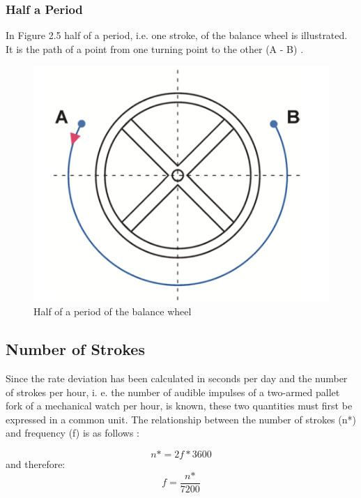 \documentclass[12pt, a4paper]{report}
\begin{document}
\subsubsection{Half a Period}
In Figure 2.5 half of a period, i.e. one stroke, of the balance wheel is illustrated. It is the path of a point from one turning point to the other (A - B) \cite{Witschi_basics}.
    \begin{figure}[H]
    \centering
    \includegraphics[scale=0.4]{Images/Halfperiod.png}
    
    \caption{Half of a period of the balance wheel \cite{Witschi_basics}}
    \end{figure}
\bigskip
    
    \subsection{Number of Strokes}
    Since the rate deviation has been calculated in seconds per day and the number of strokes per hour, i. e. the number of audible impulses of a two-armed pallet fork of a mechanical watch per hour, is known, these two quantities must first be expressed in a common unit. The relationship between the number of strokes (n*) and frequency (f) is as follows \cite{Krug1987}: 
    
    \begin{displaymath}
    n\text{*} = 2f*3600
     \end{displaymath}
     and therefore:
     \begin{displaymath}
      f = \frac{n\text{*}}{7200}
     \end{displaymath}
     
\end{document}
